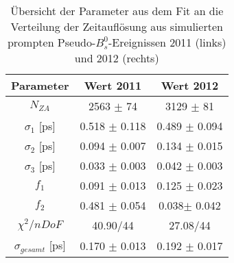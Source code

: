 \documentclass{article}
\begin{document}
\begin{table}[h!]
\noindent \begin{centering}
\begin{tabular}{c|c|c}
Parameter & Wert 2011 & Wert 2012 \tabularnewline
\hline 
$N_{ZA}$ & 2563 $\pm$ 74& 3129 $\pm$ 81 \tabularnewline
$\sigma_1$ [ps] & 0.518 $\pm$ 0.118& 0.489 $\pm$ 0.094 \tabularnewline
$\sigma_2$ [ps]& 0.094 $\pm$ 0.007& 0.134 $\pm$ 0.015 \tabularnewline
$\sigma_3$ [ps]& 0.033 $\pm$ 0.003& 0.042 $\pm$ 0.003 \tabularnewline
$f_1$ & 0.091 $\pm$ 0.013 & 0.125 $\pm$ 0.023\tabularnewline
$f_2$ & 0.481 $\pm$ 0.054& 0.038$\pm$ 0.042 \tabularnewline
\hline
$\chi^2/nDoF$ & 40.90/44 & 27.08/44\tabularnewline
\hline
$\sigma_{gesamt}$ [ps] & 0.170 $\pm$ 0.013 & 0.192 $\pm$ 0.017\tabularnewline
\end{tabular}
\par \end{centering}
\caption{Übersicht der Parameter aus dem Fit an die Verteilung der Zeitauflösung aus simulierten prompten Pseudo-$B_s^0$-Ereignissen 2011 (links) und 2012 (rechts)}
\label{table:fitpromptMC}
\end{table}
\end{document}
